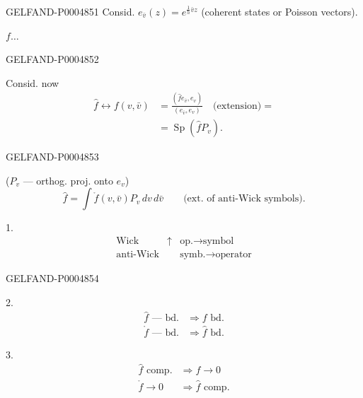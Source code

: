 \begin{GelfandAdjacentEvidence}{GELFAND-P000485}{1}
Consid. $e_{\bar v}(z)=e^{\frac1h\bar v z}$ (coherent states or Poisson vectors).

\sout{\mbox{$f\ldots$}}
\end{GelfandAdjacentEvidence}
\begin{GelfandAdjacentEvidence}{GELFAND-P000485}{2}


Consid. now
\[
\begin{aligned}
\hat f\longleftrightarrow f(v,\bar v)
&=\frac{(\hat f e_{\bar v},e_v)}{(e_{\bar v},e_v)}
\quad\text{(extension)}={}\\
&=\operatorname{Sp}(\hat fP_v).
\end{aligned}
\]
\end{GelfandAdjacentEvidence}
\begin{GelfandAdjacentEvidence}{GELFAND-P000485}{3}


($P_v$ — orthog. proj. onto $e_v$)
\[
\hat f=\int\mathring f(v,\bar v)P_v\,dv\,d\bar v
\qquad\text{(ext. of anti-Wick symbols).}
\]


1.
\[
\begin{array}{llll}
\text{Wick} & \uparrow & \text{op.}\longrightarrow\text{symbol}\\
\text{anti-Wick} && \text{symb.}\longrightarrow\text{operator}
\end{array}
\]
\end{GelfandAdjacentEvidence}
\begin{GelfandAdjacentEvidence}{GELFAND-P000485}{4}


2.
\[
\begin{aligned}
\hat f\text{ — bd.}&\Longrightarrow f\text{ bd.}\\
\mathring f\text{ — bd.}&\Longrightarrow\hat f\text{ bd.}
\end{aligned}
\]

3.
\[
\begin{aligned}
\hat f\text{ comp.}&\Longrightarrow f\to0\\
\mathring f\to0&\Longrightarrow\hat f\text{ comp.}
\end{aligned}
\]
\end{GelfandAdjacentEvidence}
